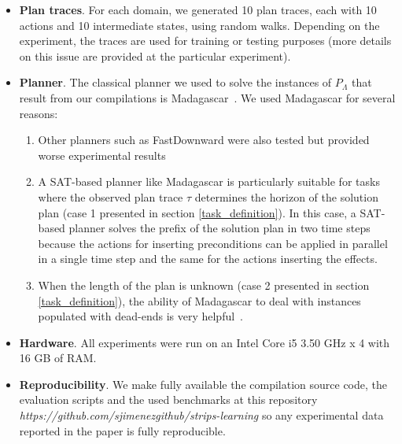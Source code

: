 \begin{itemize}
\item {\bf Plan traces}. For each domain, we generated 10 plan traces, each with 10 actions and 10 intermediate states, using random walks. Depending on the experiment, the traces are used for training or testing purposes (more details on this issue are provided at the particular experiment).

\item {\bf Planner}. The classical planner we used to solve the instances of $P_\Lambda$ that result from our compilations is {\sc Madagascar}~\cite{rintanen2014madagascar}. We used {\sc Madagascar} for several reasons:

  \begin{enumerate}
  \item \textcolor[rgb]{1.00,0.00,0.00}{Other planners such as {\sc FastDownward} were also tested but provided worse experimental results}
  \item \textcolor[rgb]{1.00,0.00,0.00}{A SAT-based planner like {\sc Madagascar} is particularly suitable for tasks where the observed plan trace $\tau$ determines the horizon of the solution plan (case 1 presented in section \ref{task_definition})}. In this case, a SAT-based planner solves the prefix of the solution plan in two time steps because the actions for inserting preconditions can be applied in parallel in a single time step and the same for the actions inserting the effects.
  \item \textcolor[rgb]{1.00,0.00,0.00}{When the length of the plan is unknown (case 2 presented in section \ref{task_definition}), the ability of {\sc Madagascar} to deal with instances populated with dead-ends is very helpful~\cite{lopez2015deterministic}.}
  \end{enumerate}

\item {\bf Hardware}. All experiments were run on an Intel Core i5 3.50 GHz x 4 with 16 GB of RAM.

\item {\bf Reproducibility}. We make fully available the compilation source code, the evaluation scripts and the used benchmarks at this repository {\em https://github.com/sjimenezgithub/strips-learning} so any experimental data reported in the paper is fully reproducible.
\end{itemize}

